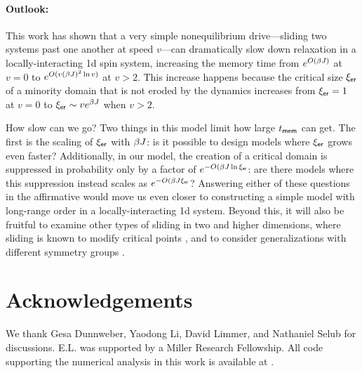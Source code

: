 \documentclass[prl,aps,twocolumn,groupedaddress,superscriptaddress,preprintnumbers,nobibnotes]{revtex4-2}
\newcommand{\tmem}{{t_{\sf mem}}}
\newcommand{\ler}{{\xi_{\sf er}}} %
\begin{document}
	\paragraph{Outlook: } 
	This work has shown that a very simple nonequilibrium drive---sliding two systems past one another at speed $v$---can dramatically slow down relaxation in a locally-interacting 1d spin system, increasing the memory time from $e^{O(\beta J)}$ at $v=0$ to $e^{O(v(\beta J)^2  \ln v)}$ at $v>2$. This increase happens because the critical size $\ler$ of a minority domain that is not eroded by the dynamics increases from $\ler = 1$ at $v=0$ to $\ler \sim v e^{\b J}$ when $v>2$. 
	
	How slow can we go? Two things in this model limit how large $\tmem$ can get. The first is the scaling of $\ler$ with $\beta J$: is it possible to design models where $\ler$ grows even faster? Additionally, in our model, the creation of a critical domain is suppressed in probability only by a factor of $e^{-O(\b J \ln \ler}$: are there models where this suppression instead scales as $e^{-O(\b J \ler}$? Answering either of these questions in the affirmative would move us even closer to constructing a simple model with long-range order in a locally-interacting 1d system.  
	Beyond this, it will also be fruitful to examine other types of sliding in two and higher dimensions, where sliding is known to modify critical points \cite{hucht2009nonequilibrium,angst2012strongly}, and to consider generalizations with different symmetry groups \cite{igloi2011nonequilibrium}. 
	
	\section{Acknowledgements} 
	
	We thank Gesa Dunnweber, Yaodong Li, David Limmer, and Nathaniel Selub for discussions. E.L. was supported by a Miller Research Fellowship. All code supporting the numerical analysis in this work is available at \cite{code}. 
	
	
	
	\appendix 
	
\
\end{document}
